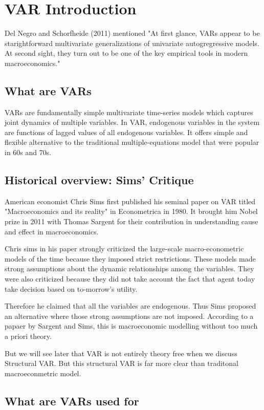 \section{VAR Introduction}
Del Negro and Schorfheide (2011) mentioned "At first glance, VARs appear to be starightforward multivariate generalizations of univariate autogregressive models. At second sight, they turn out to be one of the key empirical tools in modern macroeconomics."

\subsection{What are VARs}
VARs are fundamentally simple multivariate time-series models which captures joint dynamics of multiple variables. In VAR, endogenous variables in the system are functions of lagged values of all endogenous variables. It offers simple and flexible alternative to the traditional multiple-equations model that were popular in 60s and 70s. 

\subsection{Historical overview: Sims' Critique}
American economist Chris Sims first published his seminal paper on VAR titled "Macroeconomics and its reality" in Econometrica in 1980. It brought him Nobel prize in 2011 with Thomas Sargent for their contribution in understanding cause and effect in macroeconomics. 

Chris sims in his paper strongly criticized the large-scale macro-econometric models of the time because they imposed  strict restrictions. These models made strong assumptions about the dynamic relationships among the variables. They were also criticized because they did not take account the fact that agent today take decision based on to-morrow's utility. 

Therefore he claimed that all the variables are endogenous. Thus Sims proposed an alternative where those strong assumptions are not imposed. According to a papaer by Sargent and Sims, this is macroeconomic modelling without too much a priori theory. 

But we will see later that VAR is not entirely theory free when we discuss Structural VAR. But this structural VAR is far more clear than traditonal macroeconmetric model. 

\subsection{What are VARs used for}

